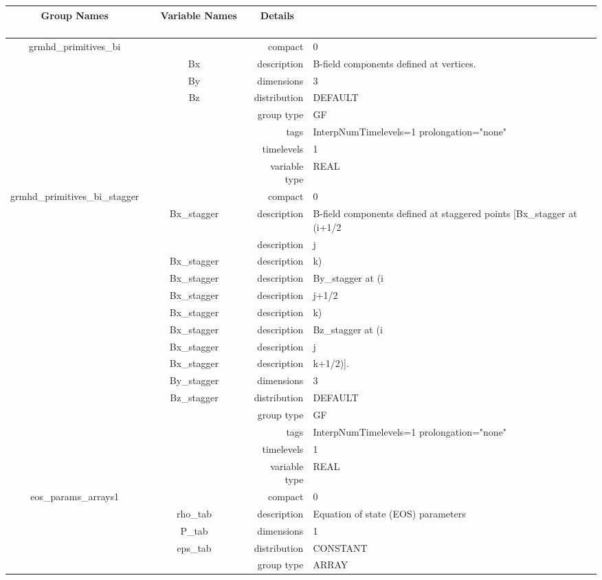 \documentclass{article}
\begin{document}
\begin{tabular*}{150mm}{|c|c@{\extracolsep{\fill}}|rl|} \hline 
~ {\bf Group Names} ~ & ~ {\bf Variable Names} ~  &{\bf Details} ~ & ~ \\ 
\hline 
grmhd\_primitives\_bi &  & compact & 0 \\ 
 & Bx & description & B-field components defined at vertices. \\ 
 & By & dimensions & 3 \\ 
 & Bz & distribution & DEFAULT \\ 
 &  & group type & GF \\ 
 &  & tags & InterpNumTimelevels=1 prolongation="none" \\ 
 &  & timelevels & 1 \\ 
 &  & variable type & REAL \\ 
\hline 
grmhd\_primitives\_bi\_stagger &  & compact & 0 \\ 
 & Bx\_stagger & description & B-field components defined at staggered points [Bx\_stagger at (i+1/2 \\ 
& ~ & description & j \\ 
 & Bx\_stagger & description & k) \\ 
 & Bx\_stagger & description & By\_stagger at (i \\ 
 & Bx\_stagger & description & j+1/2 \\ 
 & Bx\_stagger & description & k) \\ 
 & Bx\_stagger & description & Bz\_stagger at (i \\ 
 & Bx\_stagger & description & j \\ 
 & Bx\_stagger & description & k+1/2)]. \\ 
 & By\_stagger & dimensions & 3 \\ 
 & Bz\_stagger & distribution & DEFAULT \\ 
 &  & group type & GF \\ 
 &  & tags & InterpNumTimelevels=1 prolongation="none" \\ 
 &  & timelevels & 1 \\ 
 &  & variable type & REAL \\ 
\hline 
eos\_params\_arrays1 &  & compact & 0 \\ 
 & rho\_tab & description & Equation of state (EOS) parameters \\ 
 & P\_tab & dimensions & 1 \\ 
 & eps\_tab & distribution & CONSTANT \\ 
 &  & group type & ARRAY \\ 

\end{tabular*}
\end{document}
